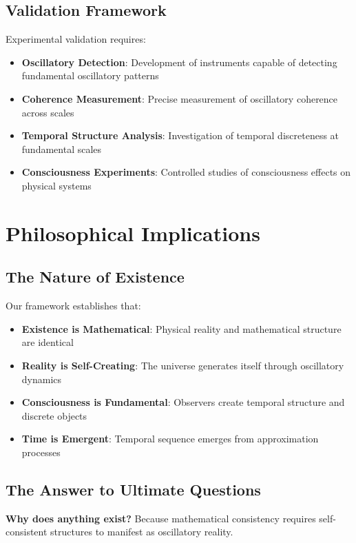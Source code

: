 \documentclass[11pt]{article}
\theoremstyle{remark}
\begin{document}
\subsection{Validation Framework}

Experimental validation requires:

\begin{itemize}
\item \textbf{Oscillatory Detection}: Development of instruments capable of detecting fundamental oscillatory patterns
\item \textbf{Coherence Measurement}: Precise measurement of oscillatory coherence across scales
\item \textbf{Temporal Structure Analysis}: Investigation of temporal discreteness at fundamental scales
\item \textbf{Consciousness Experiments}: Controlled studies of consciousness effects on physical systems
\end{itemize}

\section{Philosophical Implications}

\subsection{The Nature of Existence}

Our framework establishes that:

\begin{itemize}
\item \textbf{Existence is Mathematical}: Physical reality and mathematical structure are identical
\item \textbf{Reality is Self-Creating}: The universe generates itself through oscillatory dynamics
\item \textbf{Consciousness is Fundamental}: Observers create temporal structure and discrete objects
\item \textbf{Time is Emergent}: Temporal sequence emerges from approximation processes
\end{itemize}

\subsection{The Answer to Ultimate Questions}

\textbf{Why does anything exist?} Because mathematical consistency requires self-consistent structures to manifest as oscillatory reality.
\end{document}
